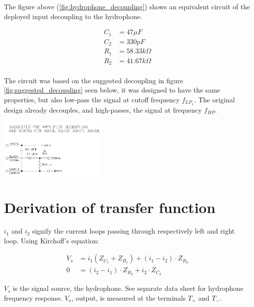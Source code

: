 \documentclass[a4paper]{article}
\begin{document}
\begin{multicols}{2}
The figure above (\ref{fig:hydrophone_decoupling}) shows an equivalent
circuit of the deployed input decoupling to the hydrophone.


\begin{align*}
  C_1 &= 47 \mu F \\
  C_2 &= 330 pF \\
  R_1 &= 58.33 k \Omega \\
  R_2 &= 41.67 k \Omega
\end{align*}

\paragraph{}The circuit was based on the suggested decoupling in figure
\ref{fig:suggested_decoupling} seen below, it was designed to have the
same properties, but also low-pass the signal at cutoff frequency
$f_{LP_1}$. The original design already decouples, and high-passes, the
signal at frequency $f_{HP}$.

  \begin{center}
    \includegraphics[width=200px]{AQ-18-decoupling-and-wiring.jpg}
  \end{center}
  \label{fig:suggested_decoupling}

\section{Derivation of transfer function}

$i_1$ and $i_2$ signify the current loops passing through respectively left
and right loop. Using Kirchoff's equation:

\begin{align}
  \label{eqn:currents_1}
  V_s &= i_1 (Z_{C_1} + Z_{R_1}) + (i_1 - i_2) \cdot Z_{R_2} \\
  0   &= (i_2 - i_1) \cdot Z_{R_2} + i_2 \cdot Z_{C_2}
  \label{eqn:currents_2}
\end{align}

$V_s$ is the signal source, the hydrophone. See separate data sheet for
hydrophone frequency response. $V_o$, output, is measured at the
terminals $T_+$ and $T_-$.


\end{multicols}
\end{document}
